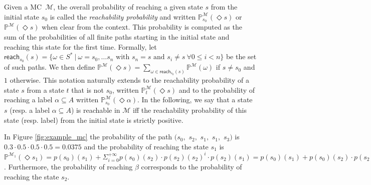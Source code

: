 \documentclass{llncs}
\newcommand{\mc}{\textnormal{MC}}
\newcommand{\Proba}            {\ensuremath{\mathbb{P}}}
\newcommand{\ltlExists}{\ensuremath{\Diamond}}
\newcommand{\st}{\ensuremath{\ | \ }}
\begin{document}
Given a \mc\ $\mathcal{M}$, the overall probability of reaching a
given state $s$ from the initial state $s_0$ is called the {\em
  reachability probability} and written
$\mathbb{P}^{\mathcal{M}}_{s_0}(\ltlExists s)$ or
$\mathbb{P}^{\mathcal{M}}(\ltlExists s)$ when clear from the
context. This probability is computed as the sum of the probabilities
of all finite paths starting in the initial state and reaching this
state for the first time. Formally, let $\mathsf{reach}_{s_0}(s) =
\{\omega \in S^{*} \st \omega = s_0, \ldots s_n \mbox{ with } s_n = s
\mbox{ and } s_i \ne s \ \forall 0 \le i < n\}$ be the set of such
paths. We then define $\mathbb{P}^{\mathcal{M}}(\ltlExists s) =
\sum_{\omega \in \mathsf{reach}_{s_0}(s)} \mathbb{P}^{\mathcal{M}}(\omega)$
if $s \ne s_0$ and $1$ otherwise. This notation naturally extends to
the reachability probability of a state $s$ from a state $t$ that is
not $s_0$, written $\mathbb{P}^{\mathcal{M}}_{t}(\ltlExists s)$
and to the
probability of reaching a label $\alpha \subseteq A$ written
$\mathbb{P}^{\mathcal{M}}_{s_0}(\ltlExists \alpha)$.
%
In the following, we say that a state $s$ (resp. a label $\alpha \subseteq A$) is reachable in $\mathcal{M}$
iff the reachability probability of this state (resp. label)
from the initial state is strictly positive.




\begin{example}
In Figure \ref{fig:example_mc} the probability of the path $(s_0,$
$s_2,$ $s_1,$ $s_1,$ $s_3)$ is $0.3 \cdot 0.5 \cdot 0.5 \cdot 0.5 =
0.0375$ and the probability of reaching the state $s_1$ is
$\Proba^{\mathcal{M}_1}(\ltlExists s_1) = p(s_0)(s_1) +
\Sigma_{i=0}^{+\infty}{p(s_0)(s_2){\cdot}p(s_2)(s_2)^i{\cdot}p(s_2)(s_1)}
= p(s_0)(s_1) + p(s_0)(s_2){\cdot}p(s_2)(s_1){\cdot}(1/(1-p(s_2)(s_2)))
= 1$.  Furthermore, the probability of reaching $\beta$ corresponds to
the probability of reaching the state $s_2$.
\end{example}
\end{document}
